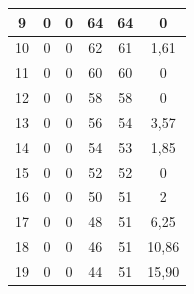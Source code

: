 \begin{table}[]
\begin{tabular}{|c|c|c|c|c|c|}
 			9                                            & 0                      & 0                     & 64                    & 64                     & 0                                                  \\ \hline
 			10                                           & 0                      & 0                     & 62                    & 61                     & 1,61                                        \\ \hline
 			11                                           & 0                      & 0                     & 60                    & 60                     & 0                                                  \\ \hline
 			12                                           & 0                      & 0                     & 58                    & 58                     & 0                                                  \\ \hline
 			13                                           & 0                      & 0                     & 56                    & 54                     & 3,57                                        \\ \hline
 			14                                           & 0                      & 0                     & 54                    & 53                     & 1,85                                        \\ \hline
 			15                                           & 0                      & 0                     & 52                    & 52                     & 0                                                  \\ \hline
 			16                                           & 0                      & 0                     & 50                    & 51                     & 2                                                  \\ \hline
 			17                                           & 0                      & 0                     & 48                    & 51                     & 6,25                                               \\ \hline
 			18                                           & 0                      & 0                     & 46                    & 51                     & 10,86                                       \\ \hline
 			19                                           & 0                      & 0                     & 44                    & 51                     & 15,90                                       \\ \hline

\end{tabular}
\end{table}
